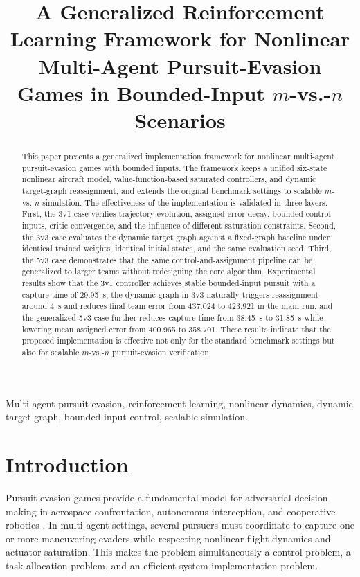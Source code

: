 ﻿\documentclass[conference]{IEEEtran}
\begin{document}
\title{A Generalized Reinforcement Learning Framework for Nonlinear Multi-Agent Pursuit-Evasion Games in Bounded-Input $m$-vs.-$n$ Scenarios}

\author{%
}

\maketitle

\begin{abstract}
This paper presents a generalized implementation framework for nonlinear multi-agent pursuit-evasion games with bounded inputs. The framework keeps a unified six-state nonlinear aircraft model, value-function-based saturated controllers, and dynamic target-graph reassignment, and extends the original benchmark settings to scalable $m$-vs.-$n$ simulation. The effectiveness of the implementation is validated in three layers. First, the 3v1 case verifies trajectory evolution, assigned-error decay, bounded control inputs, critic convergence, and the influence of different saturation constraints. Second, the 3v3 case evaluates the dynamic target graph against a fixed-graph baseline under identical trained weights, identical initial states, and the same evaluation seed. Third, the 5v3 case demonstrates that the same control-and-assignment pipeline can be generalized to larger teams without redesigning the core algorithm. Experimental results show that the 3v1 controller achieves stable bounded-input pursuit with a capture time of 29.95~s, the dynamic graph in 3v3 naturally triggers reassignment around 4~s and reduces final team error from 437.024 to 423.921 in the main run, and the generalized 5v3 case further reduces capture time from 38.45~s to 31.85~s while lowering mean assigned error from 400.965 to 358.701. These results indicate that the proposed implementation is effective not only for the standard benchmark settings but also for scalable $m$-vs.-$n$ pursuit-evasion verification.
\end{abstract}

\begin{IEEEkeywords}
Multi-agent pursuit-evasion, reinforcement learning, nonlinear dynamics, dynamic target graph, bounded-input control, scalable simulation.
\end{IEEEkeywords}

\section{Introduction}
Pursuit-evasion games provide a fundamental model for adversarial decision making in aerospace confrontation, autonomous interception, and cooperative robotics \cite{isaacs1999,jagat2017,zhang2022gamedrones}. In multi-agent settings, several pursuers must coordinate to capture one or more maneuvering evaders while respecting nonlinear flight dynamics and actuator saturation. This makes the problem simultaneously a control problem, a task-allocation problem, and an efficient system-implementation problem.
\end{document}

